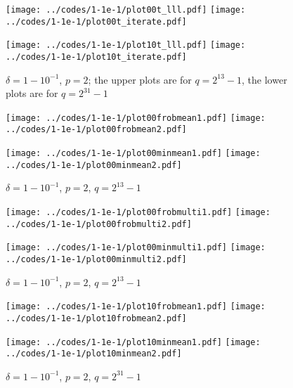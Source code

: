 \documentclass[supplement,hidelinks,onefignum,onetabnum]{siamart220329}
\begin{document}
\begin{figure}
\begin{centering}
{\texttt{[image: ../codes/1-1e-1/plot00t\_lll.pdf]}}
{\texttt{[image: ../codes/1-1e-1/plot00t\_iterate.pdf]}}

{\texttt{[image: ../codes/1-1e-1/plot10t\_lll.pdf]}}
{\texttt{[image: ../codes/1-1e-1/plot10t\_iterate.pdf]}}

\end{centering}
\caption{$\delta = 1-10^{-1}$, $p = 2$;
         the upper plots are for $q = 2^{13} - 1$,
         the lower plots are for $q = 2^{31} - 1$}
\label{p2time1-1e-1}
\end{figure}

\begin{figure}
\begin{centering}
{\texttt{[image: ../codes/1-1e-1/plot00frobmean1.pdf]}}
{\texttt{[image: ../codes/1-1e-1/plot00frobmean2.pdf]}}

{\texttt{[image: ../codes/1-1e-1/plot00minmean1.pdf]}}
{\texttt{[image: ../codes/1-1e-1/plot00minmean2.pdf]}}

\end{centering}
\caption{$\delta = 1-10^{-1}$, $p = 2$, $q = 2^{13} - 1$}
\end{figure}

\begin{figure}
\begin{centering}
{\texttt{[image: ../codes/1-1e-1/plot00frobmulti1.pdf]}}
{\texttt{[image: ../codes/1-1e-1/plot00frobmulti2.pdf]}}

{\texttt{[image: ../codes/1-1e-1/plot00minmulti1.pdf]}}
{\texttt{[image: ../codes/1-1e-1/plot00minmulti2.pdf]}}

\end{centering}
\caption{$\delta = 1-10^{-1}$, $p = 2$, $q = 2^{13} - 1$}
\end{figure}

\begin{figure}
\begin{centering}
{\texttt{[image: ../codes/1-1e-1/plot10frobmean1.pdf]}}
{\texttt{[image: ../codes/1-1e-1/plot10frobmean2.pdf]}}

{\texttt{[image: ../codes/1-1e-1/plot10minmean1.pdf]}}
{\texttt{[image: ../codes/1-1e-1/plot10minmean2.pdf]}}

\end{centering}
\caption{$\delta = 1-10^{-1}$, $p = 2$, $q = 2^{31} - 1$}
\end{figure}
\end{document}
